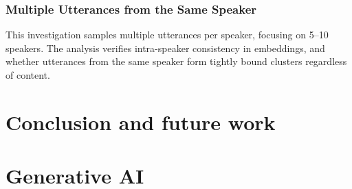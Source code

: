 \documentclass[conference]{IEEEtran}
\begin{document}
\bigskip



\subsubsection{Multiple Utterances from the Same Speaker}
This investigation samples multiple utterances per speaker, focusing on 5–10 speakers. The analysis verifies intra-speaker consistency in embeddings, and whether utterances from the same speaker form tightly bound clusters regardless of content.



\section{Conclusion and future work}




\section*{Generative AI}

\printbibliography


	
\end{document}
